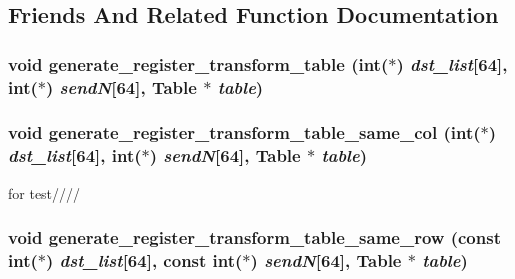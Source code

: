 \subsection{Friends And Related Function Documentation}
\hypertarget{classRlmpiInitializer_aa9cca8e4d882112207c34b03bf945a20}{
\subsubsection[{generate\_\-register\_\-transform\_\-table}]{\setlength{\rightskip}{0pt plus 5cm}void generate\_\-register\_\-transform\_\-table (int($\ast$) {\em dst\_\-list}\mbox{[}64\mbox{]}, \/  int($\ast$) {\em sendN}\mbox{[}64\mbox{]}, \/  Table $\ast$ {\em table})}}
\label{classRlmpiInitializer_aa9cca8e4d882112207c34b03bf945a20}
\hypertarget{classRlmpiInitializer_ac67b230ec20837a9ead28023dcfe7332}{
\subsubsection[{generate\_\-register\_\-transform\_\-table\_\-same\_\-col}]{\setlength{\rightskip}{0pt plus 5cm}void generate\_\-register\_\-transform\_\-table\_\-same\_\-col (int($\ast$) {\em dst\_\-list}\mbox{[}64\mbox{]}, \/  int($\ast$) {\em sendN}\mbox{[}64\mbox{]}, \/  Table $\ast$ {\em table})}}
\label{classRlmpiInitializer_ac67b230ec20837a9ead28023dcfe7332}


for test//// \hypertarget{classRlmpiInitializer_af5b98639ee3f637ee3b94b890a8f8ea1}{
\subsubsection[{generate\_\-register\_\-transform\_\-table\_\-same\_\-row}]{\setlength{\rightskip}{0pt plus 5cm}void generate\_\-register\_\-transform\_\-table\_\-same\_\-row (const int($\ast$) {\em dst\_\-list}\mbox{[}64\mbox{]}, \/  const int($\ast$) {\em sendN}\mbox{[}64\mbox{]}, \/  Table $\ast$ {\em table})}}
\label{classRlmpiInitializer_af5b98639ee3f637ee3b94b890a8f8ea1}


